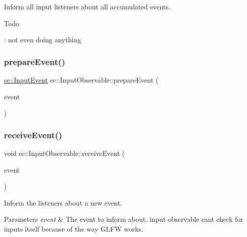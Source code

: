 Inform all input listeners about all accumulated events. 

\begin{DoxyRefDesc}{Todo}
\item[\mbox{\hyperlink{todo__todo000008}{Todo}}]\+: not even doing anything \end{DoxyRefDesc}
\mbox{\label{classec_1_1_input_observable_a7aaa88f25dd3d8902bc6767240c83ecf}} 
\subsubsection{\texorpdfstring{prepare\+Event()}{prepareEvent()}}
{\footnotesize\ttfamily \mbox{\hyperlink{structec_1_1_input_event}{ec\+::\+Input\+Event}} ec\+::\+Input\+Observable\+::prepare\+Event (\begin{DoxyParamCaption}\item[{const \mbox{\hyperlink{structec_1_1_input_event}{Input\+Event}} \&}]{event }\end{DoxyParamCaption})\hspace{0.3cm}{\ttfamily [protected]}}

\mbox{\label{classec_1_1_input_observable_ac35d29f643a2735e4cb38cb6ee1354aa}} 
\subsubsection{\texorpdfstring{receive\+Event()}{receiveEvent()}}
{\footnotesize\ttfamily void ec\+::\+Input\+Observable\+::receive\+Event (\begin{DoxyParamCaption}\item[{const \mbox{\hyperlink{structec_1_1_input_event}{Input\+Event}} \&}]{event }\end{DoxyParamCaption})\hspace{0.3cm}{\ttfamily [virtual]}}



Inform the listeners about a new event. 


\begin{DoxyParams}{Parameters}
{\em event} & The event to inform about.  input observable can\textquotesingle{}t check for inputs itself because of the way G\+L\+FW works. \\
\hline
\end{DoxyParams}
\mbox{\label{classec_1_1_input_observable_a542bd14ecfbeceed917ea0df5c7f3755}} 
